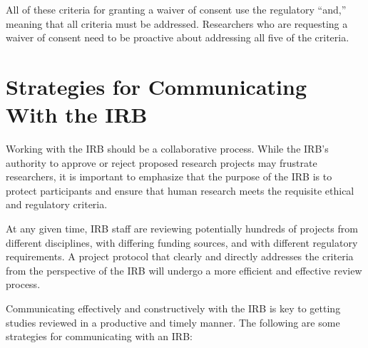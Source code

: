 All of these criteria for granting a waiver of consent use the regulatory ``and,'' meaning that all criteria must be addressed. Researchers who are requesting a waiver of consent need to be proactive about addressing all five of the criteria.

\hypertarget{strategies-for-communicating-with-the-irb}{%
\section{Strategies for Communicating With the IRB}\label{strategies-for-communicating-with-the-irb}}

Working with the IRB should be a collaborative process. While the IRB's authority to approve or reject proposed research projects may frustrate researchers, it is important to emphasize that the purpose of the IRB is to protect participants and ensure that human research meets the requisite ethical and regulatory criteria.

At any given time, IRB staff are reviewing potentially hundreds of projects from different disciplines, with differing funding sources, and with different regulatory requirements. A project protocol that clearly and directly addresses the criteria from the perspective of the IRB will undergo a more efficient and effective review process.

Communicating effectively and constructively with the IRB is key to getting studies reviewed in a productive and timely manner. The following are some strategies for communicating with an IRB:

